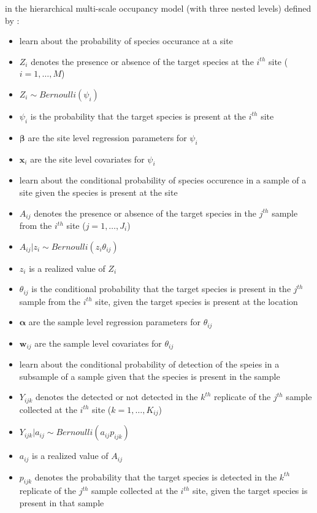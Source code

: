 \documentclass[12pt]{article}\usepackage[]{graphicx}\usepackage[]{color}
\begin{document}
in the hierarchical multi-scale occupancy model (with three nested levels) defined by \cite{Dorazio_Erickson}:
\begin{itemize}
\item learn about the probability of species occurance at a site 
\item $Z_i$ denotes the presence or absence of the target species at the $i^{th}$ site ($i = 1, \dots, M$)
\item $Z_i \sim Bernoulli(\psi_i)$
\item $\psi_i$ is the probability that the target species is present at the $i^{th}$ site
\item $\bm{\beta}$ are the site level regression parameters for $\psi_i$
\item $\bm{x}_i$ are the site level covariates for $\psi_i$
\item learn about the conditional probability of species occurence in a sample of a site given the species is present at the site
\item $A_{ij}$ denotes the presence or absence of the target species in the $j^{th}$ sample from the $i^{th}$ site ($j = 1, \dots, J_i$)
\item $A_{ij}|z_i \sim Bernoulli(z_i\theta_{ij})$
\item $z_i$ is a realized value of $Z_i$
\item $\theta_{ij}$ is the conditional probability that the target species is present in the $j^{th}$ sample from the $i^{th}$ site, given the target species is present at the location 
\item $\bm{\alpha}$ are the sample level regression parameters for $\theta_{ij}$
\item $\bm{w}_{ij}$ are the sample level covariates for $\theta_{ij}$
\item learn about the conditional probability of detection of the speies in a subsample of a sample given that the species is present in the sample
\item $Y_{ijk}$ denotes the detected or not detected in the $k^{th}$ replicate of the $j^{th}$ sample collected at the $i^{th}$ site ($k = 1, \dots, K_{ij}$)
\item $Y_{ijk}|a_{ij} \sim Bernoulli(a_{ij}p_{ijk})$
\item $a_{ij}$ is a realized value of $A_{ij}$
\item $p_{ijk}$ denotes the probability that the target species is detected in the $k^{th}$ replicate of the $j^{th}$ sample collected at the $i^{th}$ site, given the target species is present in that sample

\end{itemize}
\end{document}
